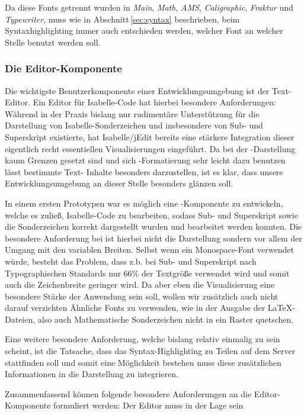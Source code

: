Da diese Fonts getrennt wurden in \textit{Main}, \textit{Math}, \textit{AMS}, \textit{Caligraphic},
\textit{Fraktur} und \textit{Typewriter}, muss wie in Abschnitt\,\ref{sec:syntax} beschrieben, beim
Syntaxhighlighting immer auch entschieden werden, welcher Font an welcher Stelle benutzt werden
soll.

\subsubsection{Die Editor-Komponente}
\label{sec:editor}

Die wichtigste Benutzerkomponente einer Entwicklungsumgebung ist der Text-Editor. Ein Editor für
Isabelle-Code hat hierbei besondere Anforderungen: Während in der Praxis bislang nur rudimentäre
Unterstützung für die Darstellung von Isabelle-Sonderzeichen und insbesondere von Sub- und
Superskript existierte, hat Isabelle/jEdit bereits eine stärkere Integration dieser eigentlich recht
essentiellen Visualisierungen eingeführt. \cite{iscala} Da bei der -Darstellung kaum
Grenzen gesetzt sind und sich -Formatierung sehr leicht dazu benutzen lässt bestimmte Text-
Inhalte besonders darzustellen, ist es klar, dass unsere Entwicklungsumgebung an dieser Stelle
besonders glänzen soll.

In einem ersten Prototypen war es möglich eine -Komponente zu entwickeln, welche es zuließ,
Isabelle-Code zu bearbeiten, sodass Sub- und Superskript sowie die Sonderzeichen korrekt dargestellt
wurden und bearbeitet werden konnten. Die besondere Anforderung bei ist hierbei nicht die
Darstellung sondern vor allem der Umgang mit den variablen Breiten. Selbst wenn ein Monospace-Font
verwendet würde, besteht das Problem, dass z.b. bei Sub- und Superskript nach Typographischen
Standards nur 66\% der Textgröße verwendet wird und somit auch die Zeichenbreite geringer wird. Da
aber eben die Visualisierung eine besondere Stärke der Anwendung sein soll, wollen wir zusätzlich
auch nicht darauf verzichten Ähnliche Fonts zu verwenden, wie in der Ausgabe der LaTeX-Dateien, also
auch Mathematische Sonderzeichen nicht in ein Raster quetschen. 

Eine weitere besondere Anforderung, welche bislang relativ einmalig zu sein scheint, ist die
Tatsache, dass das Syntax-Highlighting zu Teilen auf dem Server stattfinden soll und somit eine
Möglichkeit bestehen muss diese zusätzlichen Informationen in die Darstellung zu integrieren.

Zusammenfassend können folgende besondere Anforderungen an die Editor-Komponente formuliert werden:
Der Editor muss in der Lage sein


